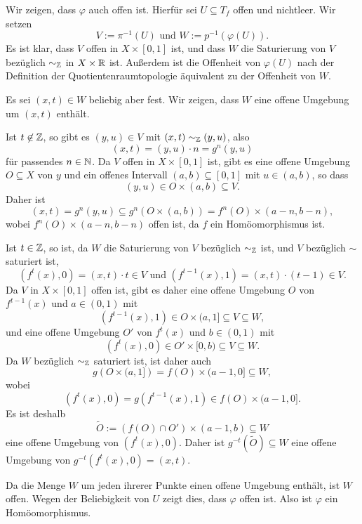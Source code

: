 \documentclass[a4paper,10pt]{article}
\begin{document}
Wir zeigen, dass $\varphi$ auch offen ist. Hierfür sei $U \subseteq T_f$ offen und nichtleer. Wir setzen
\[
 V := \pi^{-1}(U) \text{ und }
 W := p^{-1}(\varphi(U)).
\]
Es ist klar, dass $V$ offen in $X \times [0,1]$ ist, und dass $W$ die Saturierung von $V$ bezüglich $\sim_{\mathbb{Z}}$ in $X \times \mathbb{R}$ ist. Außerdem ist die Offenheit von $\varphi(U)$ nach der Definition der Quotientenraumtopologie äquivalent zu der Offenheit von $W$.

Es sei $(x,t) \in W$ beliebig aber fest. Wir zeigen, dass $W$ eine offene Umgebung um $(x,t)$ enthält.

Ist $t \not\in \mathbb{Z}$, so gibt es $(y,u) \in V$ mit $(x,t) \sim_{\mathbb{Z}} (y,u)$, also
\[
 (x,t) = (y,u) \cdot n = g^n(y,u)
\]
für passendes $n \in \mathbb{N}$. Da $V$ offen in $X \times [0,1]$ ist, gibt es eine offene Umgebung $O \subseteq X$ von $y$ und ein offenes Intervall $(a,b) \subseteq [0,1]$ mit $u \in (a,b)$, so dass
\[
 (y,u) \in O \times (a,b) \subseteq V.
\]
Daher ist
\[
 (x,t) = g^n(y,u) \subseteq g^n(O \times (a,b)) = f^n(O) \times (a-n,b-n),
\]
wobei $f^n(O) \times (a-n,b-n)$ offen ist, da $f$ ein Homöomorphismus ist.

Ist $t \in \mathbb{Z}$, so ist, da $W$ die Saturierung von $V$ bezüglich $\sim_{\mathbb{Z}}$ ist, und $V$ bezüglich $\sim$ saturiert ist,
\[
 \left( f^{t}(x) , 0 \right) = (x,t) \cdot t \in V  \text{ und }
 \left( f^{t-1}(x) , 1 \right) = (x,t) \cdot (t-1) \in V.
\]
Da $V$ in $X \times [0,1]$ offen ist, gibt es daher eine offene Umgebung $O$ von $f^{t-1}(x)$ und $a \in (0,1)$ mit
\[
 \left( f^{t-1}(x), 1 \right) \in O \times (a,1] \subseteq V \subseteq W,
\]
und eine offene Umgebung $O'$ von $f^{t}(x)$ und $b \in (0,1)$ mit
\[
 \left( f^{t}(x), 0 \right) \in O' \times [0,b) \subseteq V \subseteq W.
\]
Da $W$ bezüglich $\sim_{\mathbb{Z}}$ saturiert ist, ist daher auch
\[
 g\left( O \times (a,1] \right) = f(O) \times (a-1,0] \subseteq W,
\]
wobei
\[
 \left( f^{t}(x), 0 \right) = g\left( f^{t-1}(x), 1 \right) \in f(O) \times (a-1,0].
\]
Es ist deshalb
\[
 \tilde{O} := (f(O) \cap O') \times (a-1,b) \subseteq W
\]
eine offene Umgebung von $\left( f^{t}(x), 0 \right)$. Daher ist $g^{-t}(\tilde{O}) \subseteq W$ eine offene Umgebung von $g^{-t}(f^t(x),0) = (x,t)$.

Da die Menge $W$ um jeden ihrerer Punkte einen offene Umgebung enthält, ist $W$ offen. Wegen der Beliebigkeit von $U$ zeigt dies, dass $\varphi$ offen ist. Also ist $\varphi$ ein Homöomorphismus.





\section{}
\end{document}
